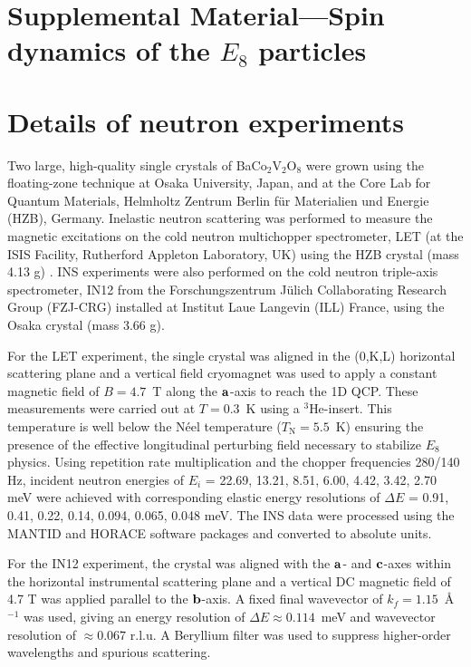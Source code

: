 \documentclass[aps,prl,twocolumn,superscriptaddress,groupedaddress]{revtex4}
\begin{document}






\newpage
\appendix
\onecolumngrid
\section*{{\Large Supplemental Material---Spin dynamics of the $E_8$ particles}}


\section{Details of neutron experiments}

Two large, high-quality single crystals of BaCo$_2$V$_2$O$_8$ were grown using the floating-zone technique at Osaka University, Japan, and at the Core Lab for Quantum Materials, Helmholtz Zentrum Berlin f\"ur Materialien und Energie (HZB), Germany. Inelastic neutron scattering was performed to measure the magnetic excitations on the cold neutron multichopper spectrometer, LET (at the ISIS Facility, Rutherford Appleton Laboratory, UK) using the HZB crystal (mass 4.13 g) \cite{LET}. INS experiments were also performed on the cold neutron triple-axis spectrometer, IN12 from the Forschungszentrum Jülich Collaborating Research Group (FZJ-CRG) installed at Institut Laue Langevin (ILL) France, using the Osaka crystal (mass 3.66 g). 
\par
For the LET experiment, the single crystal was aligned in the (0,K,L) horizontal scattering plane and a vertical field cryomagnet was used to apply a constant magnetic field of $B=4.7$~T along the ${\bf a}$-axis to reach the 1D QCP. These measurements were carried out at $T=0.3$~K using a $^3$He-insert. This temperature is well below the N\'eel temperature ($T_{\mathrm{N}}=5.5$~K) ensuring the presence of the effective longitudinal perturbing field necessary to stabilize $E_8$ physics. Using repetition rate multiplication and the chopper frequencies 280/140 Hz, incident neutron energies of $E_i$ = 22.69, 13.21, 8.51, 6.00, 4.42, 3.42, 2.70 meV were achieved with corresponding elastic energy resolutions of $\Delta E$ = 0.91, 0.41, 0.22, 0.14, 0.094, 0.065, 0.048 meV. The INS data were processed using the MANTID and HORACE software packages and converted to absolute units. 
\par
For the IN12 experiment, the crystal was aligned with the ${\bf a}$- and ${\bf c}$-axes within the horizontal instrumental scattering plane and a vertical DC magnetic field of 4.7 T was applied parallel to the ${\bf b}$-axis. A fixed final wavevector of $k_f = 1.15$~\AA$^{-1}$ was used, giving an energy resolution of $\Delta E \approx 0.114$~meV and wavevector resolution of $\approx 0.067$ r.l.u. A Beryllium filter was used to suppress higher-order wavelengths and spurious scattering. 
\end{document}
